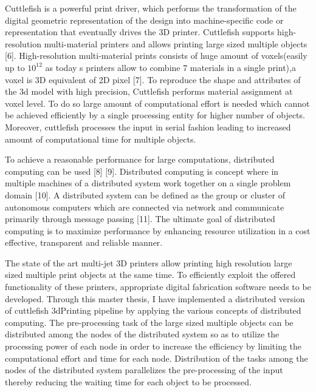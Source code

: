 Cuttlefish is a powerful print driver, which performs the transformation of the digital geometric representation of the design into machine-specific code or representation that eventually drives the 3D printer. Cuttlefish supports high-resolution multi-material printers and allows printing large sized multiple objects [6]. High-resolution multi-material prints consists of huge amount of voxels(easily up to \begin{math}10^{12}\end{math} as today \textquotesingle s printers allow to combine 7 materials in a single print),a voxel is 3D equivalent of 2D pixel [7]. To reproduce the shape and attributes of the 3d model with high precision, Cuttlefish performs material assignment at voxel level. To do so large amount of computational effort is needed which cannot be achieved efficiently by a single processing entity for higher number of objects.  Moreover, cuttlefish processes the input in serial fashion leading to increased amount of computational time for multiple objects. \newline

To achieve a reasonable performance for large computations, distributed computing can be used [8] [9].  Distributed computing is concept where in multiple machines of a distributed system work together on a single problem domain [10].  A distributed system can be defined as the group or cluster of autonomous computers which are connected via network and communicate primarily through message passing [11]. The ultimate goal of distributed computing is to maximize performance by enhancing resource utilization in a cost effective, transparent and reliable manner.\newline

The state of the art multi-jet 3D printers allow printing high resolution large sized multiple print objects at the same time. To efficiently exploit the offered functionality of these printers, appropriate digital fabrication software needs to be developed. Through this master thesis, I have implemented a distributed version of cuttlefish 3dPrinting pipeline by applying the various concepts of distributed computing. The pre-processing task of the large sized multiple objects can be distributed among the nodes of the distributed system so as to utilize the processing power of each node in order to increase the efficiency by limiting the computational effort and time for each node.   Distribution of the tasks among the nodes of the distributed system parallelizes the pre-processing of the input thereby reducing the waiting time for each object to be processed. 